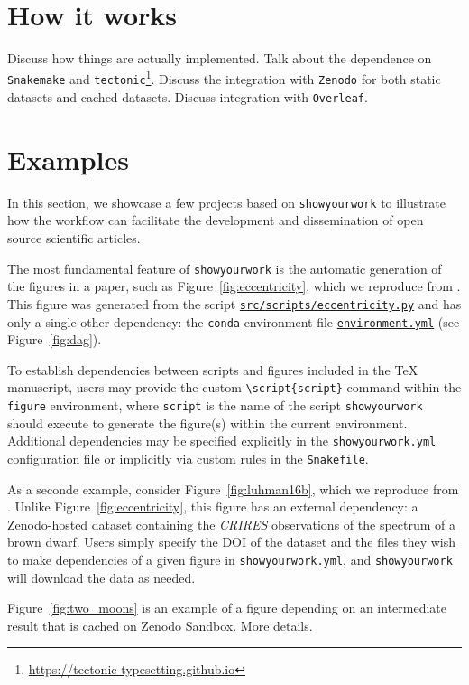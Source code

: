 \documentclass[modern]{aastex631}
\newcommand\xxx[1]{{\color{red}#1}}
\newcommand\syw{\texttt{showyourwork}\xspace}
\newcommand\repourl{https://github.com/showyourwork/showyourwork-paper}
\newcommand\fileurl[1]{\repourl/blob/\GitHubSHA/#1}
\begin{document}
\section{How it works}
\label{sec:how-it-works}
\xxx{Discuss how things are actually implemented. Talk about the dependence on \texttt{Snakemake} \citep{Molder2021} and \texttt{tectonic}\footnote{\url{https://tectonic-typesetting.github.io}}. Discuss the integration with \texttt{Zenodo} for both static datasets and cached datasets. Discuss integration with \texttt{Overleaf}.}

\section{Examples}
\label{sec:examples}
In this section, we showcase a few projects based on \syw to illustrate how the workflow can facilitate the development and dissemination of open source scientific articles.

The most fundamental feature of \syw is the automatic generation of the figures in a paper, such as Figure~\ref{fig:eccentricity}, which we reproduce from \citet{Wagg2022}.
This figure was generated from the script \href{\fileurl{src/scripts/eccentricity.py}}{\texttt{src/scripts/eccentricity.py}} and has only a single other dependency: the \texttt{conda} environment file \href{\fileurl{environment.yml}}{\texttt{environment.yml}} (see Figure~\ref{fig:dag}).

To establish dependencies between scripts and figures included in the TeX manuscript, users may provide the custom \texttt{\textbackslash script\{{\color{lsthilite}script}\}} command within the \texttt{figure} environment, where \texttt{\color{lsthilite}script} is the name of the script \syw should execute to generate the figure(s) within the current environment.
Additional dependencies may be specified explicitly in the \texttt{showyourwork.yml} configuration file or implicitly via custom rules in the \texttt{Snakefile}.

As a seconde example, consider Figure~\ref{fig:luhman16b}, which we reproduce from \citet{Luger2021c}. 
Unlike Figure~\ref{fig:eccentricity}, this figure has an external dependency: a Zenodo-hosted dataset containing the \emph{CRIRES} observations of the spectrum of a brown dwarf.
Users simply specify the DOI of the dataset and the files they wish to make dependencies of a given figure in \texttt{showyourwork.yml}, and \syw will download the data as needed.

Figure~\ref{fig:two_moons} is an example of a figure depending on an intermediate result that is cached on Zenodo Sandbox.
\xxx{More details.}
\end{document}
